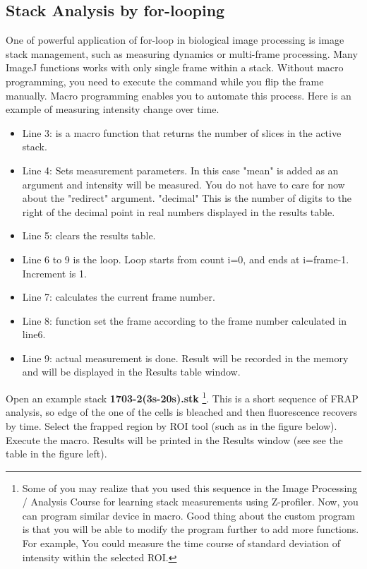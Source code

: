 \subsection{Stack Analysis by for-looping}
One of powerful application of for-loop in biological image processing is image stack management, 
such as measuring dynamics or multi-frame processing. 
Many ImageJ functions works with only single frame within a stack. 
Without macro programming, you need to execute the command while you flip the frame manually. 
Macro programming enables you to automate this process. 
Here is an example of measuring intensity change over time. 

\begin{itemize}
\item Line 3:  is a macro function that returns the number of slices in the active stack. 

\item Line 4: Sets measurement parameters. In this case "mean" is added as an argument and intensity will be measured. 
You do not have to care for now about the "redirect" argument. "decimal" This is the number of digits to 
the right of the decimal point in real numbers displayed in the results table. 

\item Line 5: clears the results table. 

\item Line 6 to 9 is the loop. Loop starts from count i=0, and ends at i=frame-1. Increment is 1.  

\item Line 7: calculates the current frame number. 

\item Line 8:  function set the frame according to the frame number calculated in line6. 

\item Line 9:  actual measurement is done. 
Result will be recorded in the memory and will be displayed in the Results table window. 
\end{itemize}

Open an example stack \textbf{1703-2(3s-20s).stk}
\footnote{Some of you may realize that you used this sequence 
in the Image Processing / Analysis Course for learning 
stack measurements using Z-profiler. Now, you can program similar 
device in macro. Good thing about the custom program 
is that you will be able to modify the program further to add more functions.
For example, You could measure the time course of standard deviation of
intensity within the selected ROI.}. This is a short sequence of FRAP analysis,
so edge of the one of the cells is bleached and then fluorescence recovers by time. 
Select the frapped region by ROI tool (such as in the figure below). 
Execute the macro. Results will be printed in the Results window (see see the table in the figure left). 

